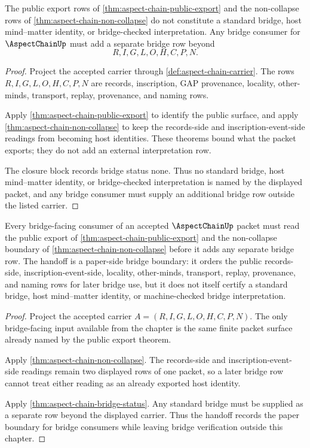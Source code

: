 \begin{theorem}
\label{thm:aspect-chain-bridge-status}
The public export rows of \autoref{thm:aspect-chain-public-export} and the non-collapse rows of \autoref{thm:aspect-chain-non-collapse} do not constitute a standard bridge, host mind--matter identity, or bridge-checked interpretation. Any bridge consumer for $\AspectChainUp$ must add a separate bridge row beyond
$$
R,I,G,L,O,H,C,P,N.
$$
\end{theorem}
\begin{proof}
Project the accepted carrier through \autoref{def:aspect-chain-carrier}. The rows $R,I,G,L,O,H,C,P,N$ are records, inscription, GAP provenance, locality, other-minds, transport, replay, provenance, and naming rows.

Apply \autoref{thm:aspect-chain-public-export} to identify the public surface, and apply \autoref{thm:aspect-chain-non-collapse} to keep the records-side and inscription-event-side readings from becoming host identities. These theorems bound what the packet exports; they do not add an external interpretation row.

The closure block records bridge status none. Thus no standard bridge, host mind--matter identity, or bridge-checked interpretation is named by the displayed packet, and any bridge consumer must supply an additional bridge row outside the listed carrier.
\end{proof}

\begin{theorem}
\label{thm:aspect-chain-bridge-handoff}
Every bridge-facing consumer of an accepted $\AspectChainUp$ packet must read the public export of \autoref{thm:aspect-chain-public-export} and the non-collapse boundary of \autoref{thm:aspect-chain-non-collapse} before it adds any separate bridge row. The handoff is a paper-side bridge boundary: it orders the public records-side, inscription-event-side, locality, other-minds, transport, replay, provenance, and naming rows for later bridge use, but it does not itself certify a standard bridge, host mind--matter identity, or machine-checked bridge interpretation.
\end{theorem}
\begin{proof}
Project the accepted carrier $A=(R,I,G,L,O,H,C,P,N)$. The only bridge-facing input available from the chapter is the same finite packet surface already named by the public export theorem.

Apply \autoref{thm:aspect-chain-non-collapse}. The records-side and inscription-event-side readings remain two displayed rows of one packet, so a later bridge row cannot treat either reading as an already exported host identity.

Apply \autoref{thm:aspect-chain-bridge-status}. Any standard bridge must be supplied as a separate row beyond the displayed carrier. Thus the handoff records the paper boundary for bridge consumers while leaving bridge verification outside this chapter.
\end{proof}

